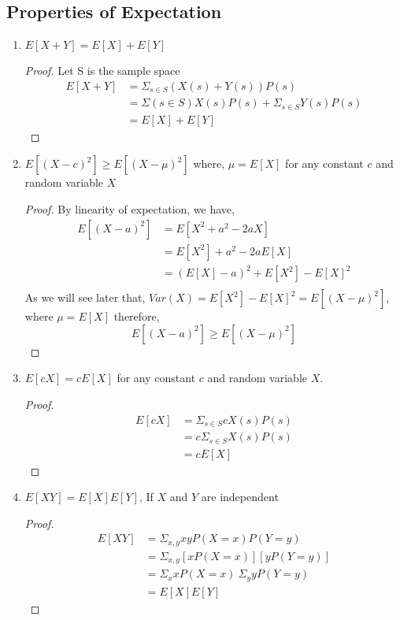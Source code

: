 \documentclass[12pt]{article}
\begin{document}
\subsection{Properties of Expectation}
\begin{enumerate}
    \item $E[X+Y] = E[X]+E[Y]$
    \vspace{-10pt}
    \begin{proof}
        Let S is the sample space
        \begin{align*}
            E[X+Y] &= \Sigma_{s \in S}(X(s)+Y(s)) P(s)\\
                    &= \Sigma(s \in S) X(s) P(s) +\Sigma_{s \in S}Y(s) P(s)\\
                    &= E[X] +E[Y]
        \end{align*}
    \end{proof}
    \item $E[(X-c)^2] \geq E[(X-\mu)^2]$ where, $\mu = E[X]$ for any constant $c$ and random variable $X$
     \vspace{-10pt}
    \begin{proof}
    By linearity of expectation, we have,
    \begin{align*}
        E[(X-a)^2] &= E[X^2+a^2-2aX]\\
                    &= E[X^2] +a^2- 2aE[X]\\
                    &= (E[X]-a)^2 +E[X^2]-E[X]^2\\
    \end{align*}
    As we will see later that, $Var(X) = E[X^2]-E[X]^2 =E[(X-\mu)^2]$, where $\mu=E[X]$ therefore,
    \[E[(X-a)^2] \geq E[(X-\mu)^2]\]
    
        
    \end{proof}
    
    \item $E[cX] = cE[X]$ for any constant $c$ and random variable $X$.
     \vspace{-10pt}
    \begin{proof}
        \begin{align*}
            E[cX] &= \Sigma_{s \in S} cX(s) P(s)\\
                  &= c \Sigma_{s \in S} X(s) P(s) \\
                  &= c E[X]
        \end{align*}
    \end{proof}
    
    \item $E[XY] = E[X]E[Y]$, If $X$ and $Y$ are independent
     \vspace{-10pt}
    \begin{proof}
        \begin{align*}
            E[XY] &= \Sigma_{x,y} xy P(X=x) P(Y=y)\\
                    &= \Sigma_{x,y} [x P(X=x)][y P(Y=y)]\\
                    &= \Sigma_{x} xP(X=x) ~\Sigma_{y} yP(Y=y)\\
                    &= E[X]E[Y]
        \end{align*}
    \end{proof}
\end{enumerate}
\end{document}
